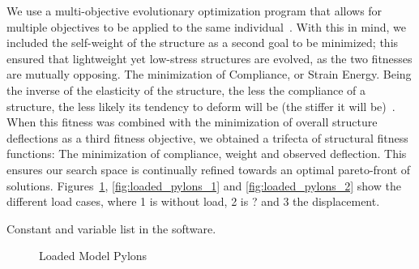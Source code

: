 \documentclass{sig-alternate}
\begin{document}
We use a multi-objective evolutionary optimization program that allows
for multiple objectives to be applied to the same
individual~\cite{fenton2011}. With this in mind, we included the
self-weight of the structure as a second goal to be minimized; this
ensured that lightweight yet low-stress structures are evolved, as the
two fitnesses are mutually opposing. The minimization of Compliance,
or Strain Energy. Being the inverse of the elasticity of the
structure, the less the compliance of a structure, the less likely its
tendency to deform will be (the stiffer it will
be)~\cite{Rozvany1998}. When this fitness was combined with the
minimization of overall structure deflections as a third fitness
objective, we obtained a trifecta of structural fitness functions: The
minimization of compliance, weight and observed deflection. This
ensures our search space is continually refined towards an optimal
pareto-front of solutions. Figures~\ref{fig:loaded_pylons_3},
\ref{fig:loaded_pylons_1} and \ref{fig:loaded_pylons_2} show the
different load cases, where 1 is without load, 2 is ? and 3 the
displacement.

Constant and variable list in the software.

\begin{figure}
  \centering
  \hfil
  \hfil
  \caption{Loaded Model Pylons}
  \label{fig:loaded_pylons_3}
\end{figure}
\end{document}
